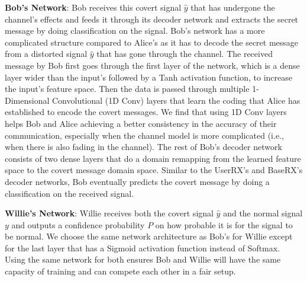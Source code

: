 \textbf{Bob's Network}: Bob receives this covert signal \(\hat{y}\) that has undergone the channel's effects and feeds it through its decoder network and extracts the secret message by doing classification on the signal. Bob's network has a more complicated structure compared to Alice's as it has to decode the secret message from a distorted signal \(\hat{y}\) that has gone through the channel. The received message by Bob first goes through the first layer of the network, which is a dense layer wider than the input's followed by a Tanh activation function, to increase the input's feature space. Then the data is passed through multiple 1-Dimensional Convolutional (1D Conv) layers that learn the coding that Alice has established to encode the covert messages. We find that using 1D Conv layers helps Bob and Alice achieving a better consistency in the accuracy of their communication, especially when the channel model is more complicated (i.e., when there is also fading in the channel). The rest of Bob's decoder network consists of two dense layers that do a domain remapping from the learned feature space to the covert message domain space. Similar to the UserRX's and BaseRX's decoder networks, Bob eventually predicts the covert message by doing a classification on the received signal.


\textbf{Willie's Network}: Willie receives both the covert signal \(\hat{y}\) and the normal signal \(y\) and outputs a confidence probability \(P\) on how probable it is for the signal to be normal. We choose the same network architecture as Bob's for Willie except for the last layer that has a Sigmoid activation function instead of Softmax. Using the same network for both ensures Bob and Willie will have the same capacity of training and can compete each other in a fair setup.